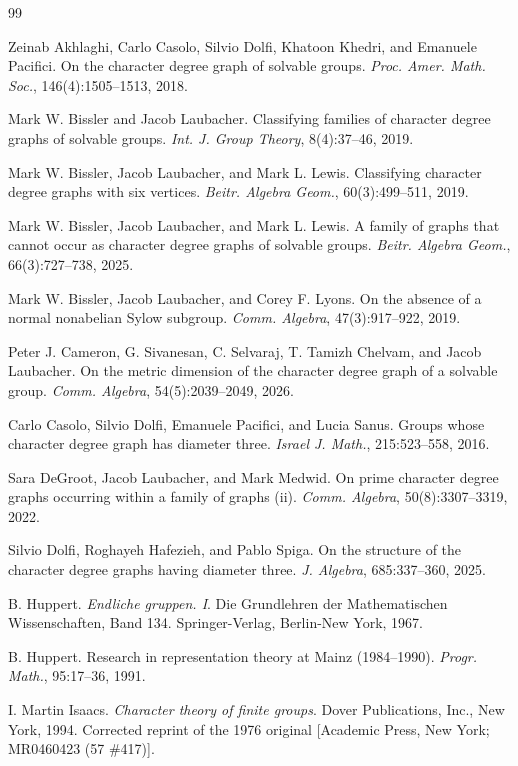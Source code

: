 \documentclass[11pt]{amsart}
\theoremstyle{definition}
\theoremstyle{remark}
\numberwithin{equation}{section}
\begin{document}
\begin{thebibliography}{99}

 Zeinab Akhlaghi, Carlo Casolo, Silvio Dolfi, Khatoon Khedri, and Emanuele Pacifici. On the character degree graph of solvable groups. \emph{Proc. Amer. Math. Soc.}, 146(4):1505--1513, 2018.

 Mark W. Bissler and Jacob Laubacher. Classifying families of character degree graphs of solvable groups. \emph{Int. J. Group Theory}, 8(4):37--46, 2019.

 Mark W. Bissler, Jacob Laubacher, and Mark L. Lewis. Classifying character degree graphs with six vertices. \emph{Beitr. Algebra Geom.}, 60(3):499--511, 2019.

 Mark W. Bissler, Jacob Laubacher, and Mark L. Lewis. A family of graphs that cannot occur as character degree graphs of solvable groups. \emph{Beitr. Algebra Geom.}, 66(3):727--738, 2025.

 Mark W. Bissler, Jacob Laubacher, and Corey F. Lyons. On the absence of a normal nonabelian Sylow subgroup. \emph{Comm. Algebra}, 47(3):917--922, 2019.

 Peter J. Cameron, G. Sivanesan, C. Selvaraj, T. Tamizh Chelvam, and Jacob Laubacher. On the metric dimension of the character degree graph of a solvable group. \emph{Comm. Algebra}, 54(5):2039--2049, 2026.

 Carlo Casolo, Silvio Dolfi, Emanuele Pacifici, and Lucia Sanus. Groups whose character degree graph has diameter three. \emph{Israel J. Math.}, 215:523--558, 2016.

 Sara DeGroot, Jacob Laubacher, and Mark Medwid. On prime character degree graphs occurring within a family of graphs (ii). \emph{Comm. Algebra}, 50(8):3307--3319, 2022.

 Silvio Dolfi, Roghayeh Hafezieh, and Pablo Spiga. On the structure of the character degree graphs having diameter three. \emph{J. Algebra}, 685:337--360, 2025.

 B. Huppert. \emph{Endliche gruppen. I}. Die Grundlehren der Mathematischen Wissenschaften, Band 134. Springer-Verlag, Berlin-New York, 1967.

 B. Huppert. Research in representation theory at Mainz (1984--1990). \emph{Progr. Math.}, 95:17--36, 1991.

 I. Martin Isaacs. \emph{Character theory of finite groups}. Dover Publications, Inc., New York, 1994. Corrected reprint of the 1976 original [Academic Press, New York; MR0460423 (57 \#417)].


\end{thebibliography}
\end{document}
